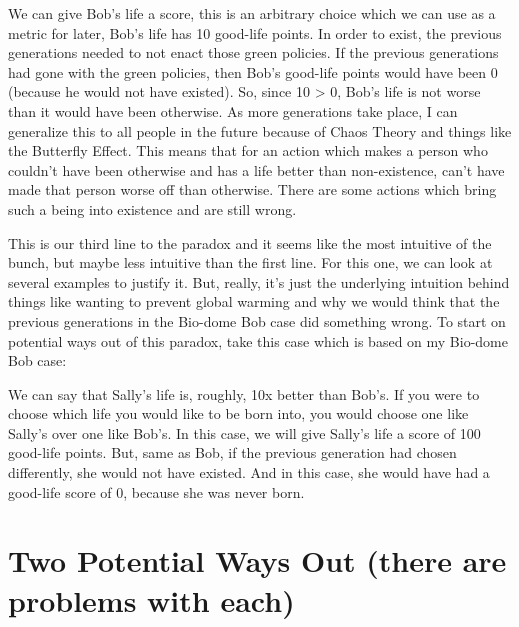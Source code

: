 We can give Bob's life a score, this is an arbitrary choice which we can use as a metric for later, Bob's life has 10 good-life points. In order to exist, the previous generations needed to not enact those green policies. If the previous generations had gone with the green policies, then Bob's good-life points would have been 0 (because he would not have existed). So, since 10 > 0, Bob's life is not worse than it would have been otherwise. As more generations take place, I can generalize this to all people in the future because of Chaos Theory and things like the Butterfly Effect. This means that for an action which makes a person who couldn't have been otherwise and has a life better than non-existence, can't have made that person worse off than otherwise. 
There are some actions which bring such a being into existence and are still wrong.

This is our third line to the paradox and it seems like the most intuitive of the bunch, but maybe less intuitive than the first line. For this one, we can look at several examples to justify it. But, really, it's just the underlying intuition behind things like wanting to prevent global warming and why we would think that the previous generations in the Bio-dome Bob case did something wrong. To start on potential ways out of this paradox, take this case which is based on my Bio-dome Bob case:


We can say that Sally's life is, roughly, 10x better than Bob's. If you were to choose which life you would like to be born into, you would choose one like Sally's over one like Bob's. In this case, we will give Sally's life a score of 100 good-life points. But, same as Bob, if the previous generation had chosen differently, she would not have existed. And in this case, she would have had a good-life score of 0, because she was never born. 

\section{Two Potential Ways Out (there are problems with each)}

